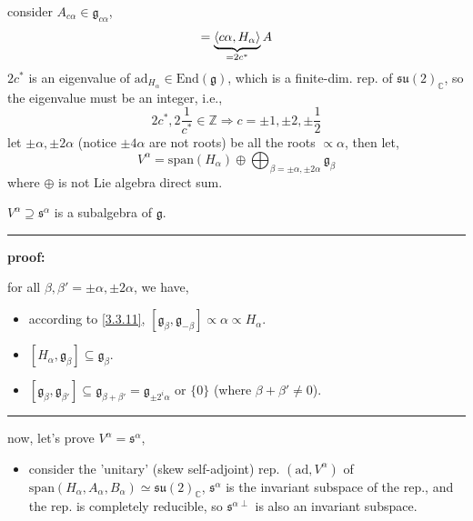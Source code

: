\begin{itemize}
	\begin{tcolorbox}[title=proof:]
		consider $A_{c \alpha} \in \mathfrak{g}_{c \alpha}$,
		\begin{equation}
			[H_\alpha, A_{c \alpha}] = \underbrace{\braket{c \alpha, H_\alpha}}_{= 2 c^*} A
		\end{equation}
		$2 c^*$ is an eigenvalue of $\mathrm{ad}_{H_\alpha} \in \mathrm{End}(\mathfrak{g})$, which is a finite-dim. rep. of $\mathfrak{su}(2)_\mathbb{C}$, so the eigenvalue must be an integer, i.e.,
		\begin{equation}
			2 c^*, 2 \frac{1}{c^*} \in \mathbb{Z} \Longrightarrow c = \pm 1, \pm 2, \pm \frac{1}{2}
		\end{equation}
		let $\pm \alpha, \pm 2 \alpha$ (notice $\pm 4 \alpha$ are not roots) be all the roots $\propto \alpha$, then let,
		\begin{equation}
			V^\alpha = \mathrm{span}(H_\alpha) \oplus \bigoplus_{\beta = \pm \alpha, \pm 2 \alpha} \mathfrak{g}_{\beta}
		\end{equation}
		where $\oplus$ is not Lie algebra direct sum.
		
		$V^\alpha \supseteq \mathfrak{s}^\alpha$ is a subalgebra of $\mathfrak{g}$.
		
		\noindent\rule[0.5ex]{\linewidth}{0.5pt} %
		
		\textbf{proof:}
		
		for all $\beta, \beta' = \pm \alpha, \pm 2 \alpha$, we have,
		\begin{itemize}
			\item according to \eqref{3.3.11}, $[\mathfrak{g}_\beta, \mathfrak{g}_{- \beta}] \propto \alpha \propto H_\alpha$.
			
			\item $[H_\alpha, \mathfrak{g}_\beta] \subseteq \mathfrak{g}_\beta$.
			
			\item $[\mathfrak{g}_\beta, \mathfrak{g}_{\beta'}] \subseteq \mathfrak{g}_{\beta + \beta'} = \mathfrak{g}_{\pm 2^i \alpha}$ or $\{0\}$ (where $\beta + \beta' \neq 0$).
		\end{itemize}
		
		\noindent\rule[0.5ex]{\linewidth}{0.5pt} %
		
		now, let's prove $V^\alpha = \mathfrak{s}^\alpha$,
		\begin{itemize}
			\item consider the 'unitary' (skew self-adjoint) rep. $(\mathrm{ad}, V^\alpha)$ of $\mathrm{span}(H_\alpha, A_\alpha, B_\alpha) \simeq \mathfrak{su}(2)_\mathbb{C}$, $\mathfrak{s}^\alpha$ is the invariant subspace of the rep., and the rep. is completely reducible, so $\mathfrak{s}^{\alpha \perp}$ is also an invariant subspace.
			

\end{itemize}
\end{tcolorbox}
\end{itemize}
